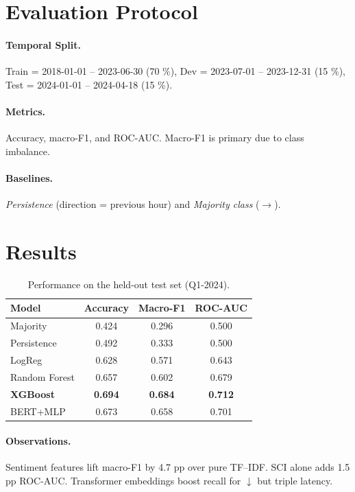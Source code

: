 \documentclass[12pt,a4paper]{article}
\begin{document}
\section{Evaluation Protocol}
\paragraph{Temporal Split.}  
Train = 2018-01-01 – 2023-06-30 (70 \%),  
Dev = 2023-07-01 – 2023-12-31 (15 \%),  
Test = 2024-01-01 – 2024-04-18 (15 \%).

\paragraph{Metrics.}  
Accuracy, macro-F1, and ROC-AUC. Macro-F1 is primary due to class
imbalance.

\paragraph{Baselines.}  
\emph{Persistence} (direction = previous hour) and
\emph{Majority class} (\(\rightarrow\)).

\section{Results}
\begin{table}[H]
\centering
\caption{Performance on the held-out test set (Q1-2024).}
\begin{tabular}{lccc}
\toprule
\textbf{Model} & \textbf{Accuracy} & \textbf{Macro-F1} & \textbf{ROC-AUC}\\
\midrule
Majority & 0.424 & 0.296 & 0.500\\
Persistence & 0.492 & 0.333 & 0.500\\
LogReg & 0.628 & 0.571 & 0.643\\
Random Forest & 0.657 & 0.602 & 0.679\\
\textbf{XGBoost} & \textbf{0.694} & \textbf{0.684} & \textbf{0.712}\\
BERT+MLP & 0.673 & 0.658 & 0.701\\
\bottomrule
\end{tabular}
\label{tab:results}
\end{table}


\paragraph{Observations.}
Sentiment features lift macro-F1 by 4.7 pp over pure TF–IDF.
SCI alone adds 1.5 pp ROC-AUC.  Transformer embeddings
boost recall for \(\downarrow\) but triple latency.
\end{document}
